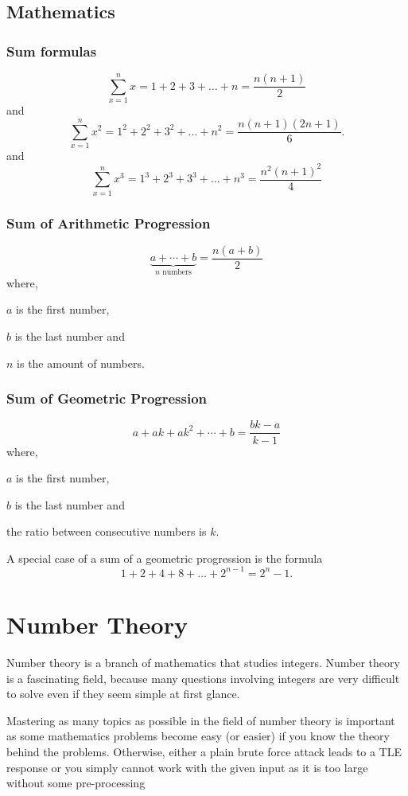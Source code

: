 \documentclass[twoside,12pt,a4paper,english]{book}
\theoremstyle{definition}
\theoremstyle{problemstyle}
\theoremstyle{problemstyle}
\theoremstyle{problemstyle}
\begin{document}
\section{Mathematics}

\subsection{Sum formulas}

\[\sum_{x=1}^n x = 1+2+3+\ldots+n = \frac{n(n+1)}{2}\]
and
\[\sum_{x=1}^n x^2 = 1^2+2^2+3^2+\ldots+n^2 = \frac{n(n+1)(2n+1)}{6}.\]
and
\[\sum_{x=1}^n x^3 = 1^3+2^3+3^3+\ldots+n^3 = \frac{n^2(n+1)^2}{4}\]

\subsection{Sum of Arithmetic Progression}

\[\underbrace{a + \cdots + b}_{n \,\, \textrm{numbers}} = \frac{n(a+b)}{2}\]
where,

$a$ is the first number,

$b$ is the last number and

$n$ is the amount of numbers.

\subsection{Sum of Geometric Progression}
\[a + ak + ak^2 + \cdots + b = \frac{bk-a}{k-1}\]
where,

$a$ is the first number,

$b$ is the last number and

the ratio between consecutive numbers is $k$.

A special case of a sum of a geometric progression is the formula
\[1+2+4+8+\ldots+2^{n-1}=2^n-1.\]

\chapter{Number Theory}

Number theory is a branch of mathematics that studies integers. Number
theory is a fascinating field, because many questions involving integers are very
difficult to solve even if they seem simple at first glance.

Mastering as many topics as possible in the field of number theory is important as some
mathematics problems become easy (or easier) if you know the theory behind the problems.
Otherwise, either a plain brute force attack leads to a TLE response or you simply cannot
work with the given input as it is too large without some pre-processing
\end{document}

